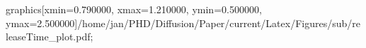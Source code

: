 graphics[xmin=0.790000, xmax=1.210000, ymin=0.500000, ymax=2.500000]{/home/jan/PHD/Diffusion/Paper/current/Latex/Figures/sub/releaseTime_plot.pdf}; 
